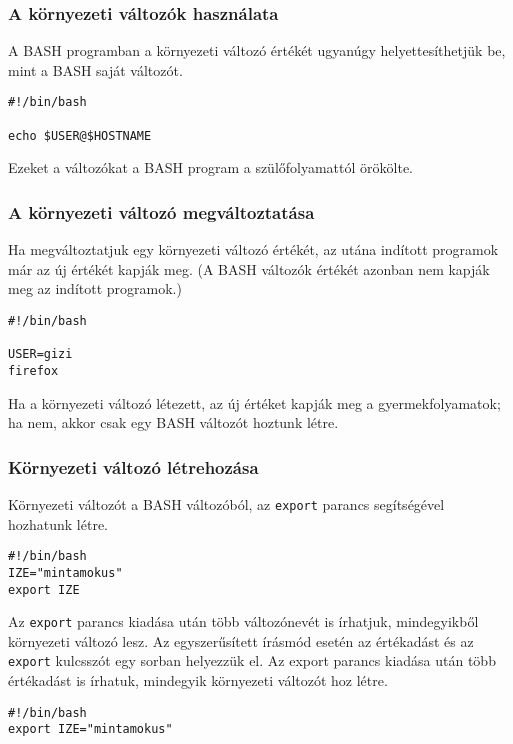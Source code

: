 \subsubsection*{A környezeti változók használata}

A BASH programban a környezeti változó értékét ugyanúgy helyettesíthetjük be, mint a BASH saját változót.
\begin{lstlisting}
#!/bin/bash

echo $USER@$HOSTNAME
\end{lstlisting}
Ezeket a változókat a BASH program a szülőfolyamattól örökölte.


\subsubsection*{A környezeti változó megváltoztatása}
Ha megváltoztatjuk egy környezeti változó értékét, az utána indított programok már az új értékét kapják meg. (A BASH változók értékét azonban nem kapják meg az indított programok.)

\begin{lstlisting}
#!/bin/bash

USER=gizi
firefox
\end{lstlisting}

Ha a környezeti változó létezett, az új értéket kapják meg a gyermekfolyamatok; 
  ha nem, akkor csak egy BASH változót hoztunk létre.

\subsubsection*{Környezeti változó létrehozása}
Környezeti változót a BASH változóból, az \texttt{export} parancs segítségével hozhatunk létre.
\begin{lstlisting}
#!/bin/bash
IZE="mintamokus"
export IZE
\end{lstlisting}

Az \texttt{export} parancs kiadása után több változónevét is írhatjuk, mindegyikből környezeti változó lesz. Az egyszerűsített írásmód esetén az értékadást és az \texttt{export} kulcsszót egy sorban helyezzük el. Az export parancs kiadása után több értékadást is írhatuk, mindegyik környezeti változót hoz létre.
\begin{lstlisting} 
#!/bin/bash
export IZE="mintamokus"
\end{lstlisting}




